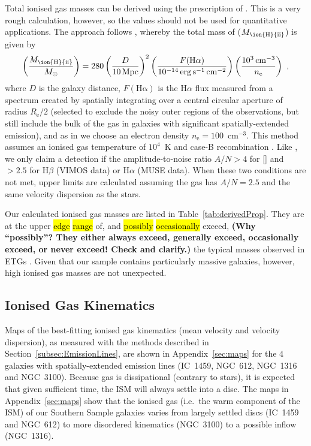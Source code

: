 \documentclass[a4paper,fleqn,usenatbib]{mnras}
\DeclareRobustCommand{\removed}[1]{{\sethlcolor{red}\hl{#1}}}
\DeclareRobustCommand{\added}[1]{{\sethlcolor{green}\hl{#1}}}
\begin{document}
Total ionised gas masses can be derived using the prescription of
\citet{Sarzi2005}. This is a very rough calculation, however, so the
values should not be used for quantitative applications. The approach
follows \citet{Kim1989}, whereby the total mass of 
($M_\text{\ion{H}{ii}}$) is given by
\begin{equation}
  \left(\frac{M_\text{\ion{H}{ii}}}{M_\odot}\right)=280\left(\frac{D}{10\,\mathrm{Mpc}}\right)^2\left(\frac{F(\mathrm{H\alpha})}{10^{-14}\,\mathrm{erg\,s^{-1}\,cm^{-2}}}\right)\left(\frac{10^3\,\mathrm{cm^{-3}}}{n_\mathrm{e}}\right)~,
\end{equation}
where $D$ is the galaxy distance, $F(\mathrm{H\alpha})$ is the
H$\alpha$ flux measured from a spectrum created by spatially
integrating over a central circular aperture of radius
$R_\mathrm{e}/2$ (selected to exclude the noisy outer regions of the
observations, but still include the bulk of the gas in galaxies with
significant spatially-extended emission), and as in \citet{Sarzi2005}
we choose an electron density $n_\mathrm{e}=100$~cm$^{-3}$. This
method assumes an ionised gas temperature of $10^4$~K and case-B
recombination \citep{Kim1989}. Like \citet{Sarzi2005}, we only claim a
detection if the amplitude-to-noise ratio $A/N>4$ for []
and $>2.5$ for H$\beta$ (VIMOS data) or H$\alpha$ (MUSE data). When
these two conditions are not met, upper limits are calculated assuming
the gas has $A/N=2.5$ and the same velocity dispersion as the stars.

Our calculated ionised gas masses are listed in
Table~\ref{tab:derivedProp}. They are at the upper \removed{edge} 
\added{range} of, and \removed{possibly} \added{occasionally} exceed, 
{\bf (Why ``possibly''? They either always exceed, generally exceed, 
occasionally exceed, or never exceed! Check and clarify.)} the 
typical masses observed in ETGs 
\citep[e.g.][]{Phillips1986, Zeilinger1996, Sarzi2005}. Given that 
our sample contains particularly massive galaxies, however, 
high ionised gas masses are not unexpected.

\subsection{Ionised Gas Kinematics}
\label{subsec:GasKin}

Maps of the best-fitting ionised gas kinematics (mean velocity and
velocity dispersion), as measured with the methods described in
Section~\ref{subsec:EmissionLines}, are shown in
Appendix~\ref{sec:maps} for the $4$ galaxies with spatially-extended
emission lines (IC~1459, NGC~612, NGC~1316 and NGC~3100). Because gas
is dissipational (contrary to stars), it is expected that given
sufficient time, the ISM will always settle into a disc. The maps in
Appendix~\ref{sec:maps} show that the ionised gas (i.e.\ the warm
component of the ISM) of our Southern Sample galaxies varies from
largely settled discs (IC~1459 and NGC~612) to more disordered
kinematics (NGC~3100) to a possible inflow (NGC~1316).
\end{document}
